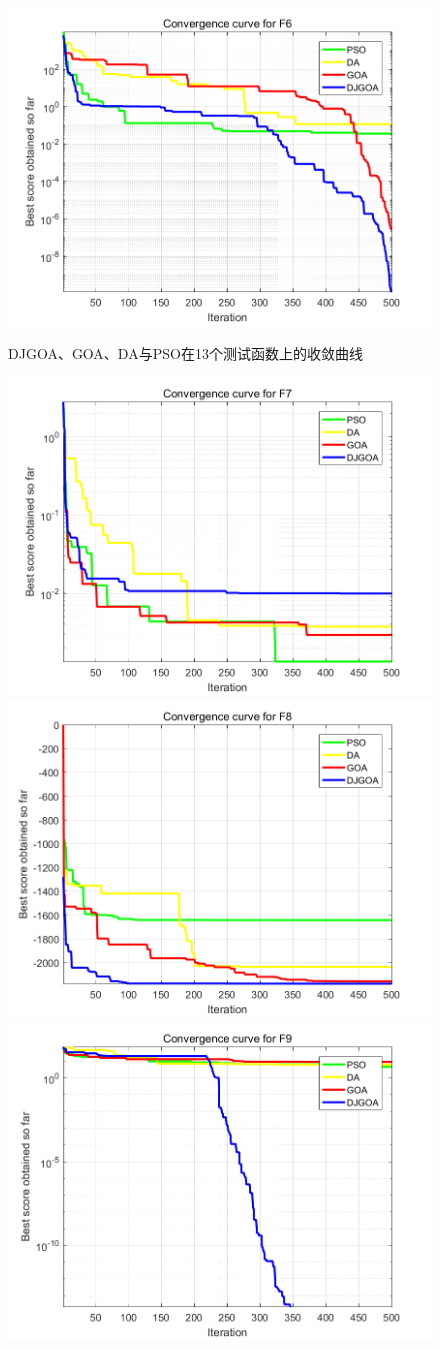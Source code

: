 \begin{figure}[!htbp]
    \includegraphics[width=.5\linewidth]{DJGOA_F6}\hfill\\[0.5cm]
    \caption{DJGOA、GOA、DA与PSO在13个测试函数上的收敛曲线}
    \label{fig:DJGOA_convergence_curve}
\end{figure}

\begin{figure}[!htbp]
    \ContinuedFloat
    \centering
    \includegraphics[width=.5\linewidth]{DJGOA_F7}\hfill
    \includegraphics[width=.5\linewidth]{DJGOA_F8}\hfill\\[0.5cm]
    \centering
    \includegraphics[width=.5\linewidth]{DJGOA_F9}\hfill

\end{figure}

